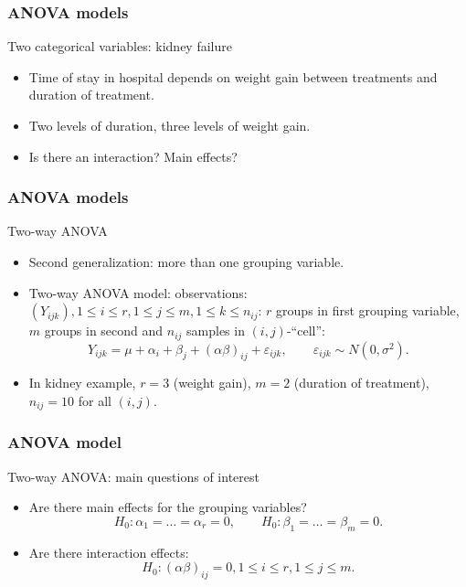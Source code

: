 \documentclass[handout]{beamer}
\begin{document}
   \begin{frame} \frametitle{ANOVA models}

   \begin{block}
   {Two categorical variables: kidney failure}

   \begin{itemize}
   \item Time of stay in hospital depends on weight gain between treatments and duration of treatment.

   \item Two levels of duration, three levels of weight gain.

   \item Is there an interaction? Main effects?

   \end{itemize}
   \end{block}
   \end{frame}


   \begin{frame} \frametitle{ANOVA models}

   \begin{block}
   {Two-way ANOVA}

   \begin{itemize}

   \item Second generalization: more than one grouping variable.
   \item Two-way ANOVA model: observations: $(Y_{ijk}), 1 \leq i \leq r, 1 \leq j \leq m, 1 \leq k \leq n_{ij}$: $r$ groups in first grouping variable, $m$ groups in second and $n_{ij}$ samples in $(i,j)$-``cell'':
   $$
   Y_{ijk} = \mu + \alpha_i + \beta_j + (\alpha \beta)_{ij} +  \varepsilon_{ijk} , \qquad \varepsilon_{ijk} \sim N(0, \sigma^2).$$
   \item In kidney example, $r=3$ (weight gain), $m=2$ (duration of treatment), $n_{ij}=10$ for all $(i,j)$.
   \end{itemize}
   \end{block}
   \end{frame}


   \begin{frame} \frametitle{ANOVA model}

   \begin{block}
   {Two-way ANOVA: main questions of interest}
   \begin{itemize}
   \item Are there main effects for the grouping variables?
   $$
   H_0:\alpha_1 = \dots = \alpha_r = 0, \qquad H_0: \beta_1 = \dots = \beta_m = 0.$$
   \item Are there interaction effects:
   $$
   H_0:(\alpha\beta)_{ij} = 0, 1 \leq i \leq r, 1 \leq j \leq m.$$
   \end{itemize}
   \end{block}
   \end{frame}
\end{document}
